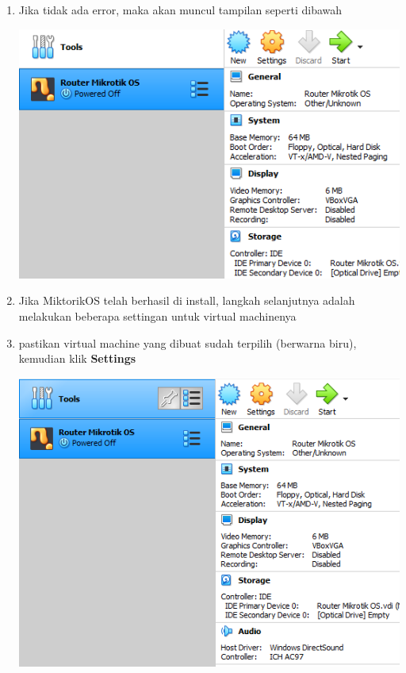 \documentclass{article}
\begin{document}
\begin{flushleft}
\begin{enumerate}
        	\item Jika tidak ada error, maka akan muncul tampilan seperti dibawah
        		\begin{center}
        			\includegraphics[scale=0.6]{terakhir}
        		\end{center}
        		        	 
        
        
        	\item Jika MiktorikOS telah berhasil di install, langkah selanjutnya adalah melakukan beberapa settingan untuk virtual machinenya
        	
			\item pastikan virtual machine yang dibuat sudah terpilih (berwarna biru), kemudian klik \textbf{Settings} 
				\begin{center}
					\includegraphics[scale=0.6]{(a)} 
				\end{center}
				

\end{enumerate}
\end{flushleft}
\end{document}
